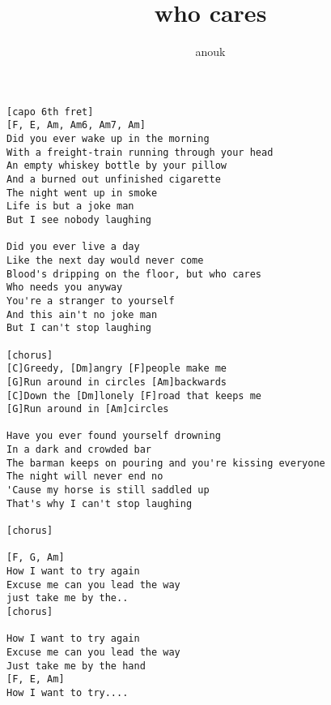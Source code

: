 \author{anouk}
\title{who cares}
\maketitle
\begin{verbatim}
[capo 6th fret]
[F, E, Am, Am6, Am7, Am]
Did you ever wake up in the morning
With a freight-train running through your head
An empty whiskey bottle by your pillow
And a burned out unfinished cigarette
The night went up in smoke
Life is but a joke man
But I see nobody laughing

Did you ever live a day
Like the next day would never come
Blood's dripping on the floor, but who cares
Who needs you anyway
You're a stranger to yourself
And this ain't no joke man
But I can't stop laughing

[chorus]
[C]Greedy, [Dm]angry [F]people make me
[G]Run around in circles [Am]backwards
[C]Down the [Dm]lonely [F]road that keeps me
[G]Run around in [Am]circles

Have you ever found yourself drowning
In a dark and crowded bar
The barman keeps on pouring and you're kissing everyone
The night will never end no
'Cause my horse is still saddled up
That's why I can't stop laughing

[chorus]

[F, G, Am]
How I want to try again
Excuse me can you lead the way
just take me by the..
[chorus]

How I want to try again
Excuse me can you lead the way
Just take me by the hand
[F, E, Am]
How I want to try....
\end{verbatim}

